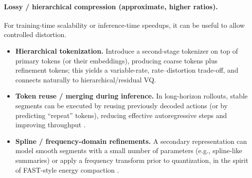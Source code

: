 \documentclass[11pt]{article}
\begin{document}
\paragraph{Lossy / hierarchical compression (approximate, higher ratios).}
For training-time scalability or inference-time speedups, it can be useful to allow controlled distortion.
\begin{itemize}
  \item \textbf{Hierarchical tokenization.} Introduce a second-stage tokenizer on top of primary tokens (or their embeddings), producing coarse tokens plus refinement tokens; this yields a variable-rate, rate--distortion trade-off, and connects naturally to hierarchical/residual VQ.
  \item \textbf{Token reuse / merging during inference.} In long-horizon rollouts, stable segments can be executed by reusing previously decoded actions (or by predicting ``repeat'' tokens), reducing effective autoregressive steps and improving throughput \cite{flashvla2025,teamvla2025}.
  \item \textbf{Spline / frequency-domain refinements.} A secondary representation can model smooth segments with a small number of parameters (e.g., spline-like summaries) or apply a frequency transform prior to quantization, in the spirit of FAST-style energy compaction \cite{fast2025,beast2025}.
\end{itemize}
\end{document}
